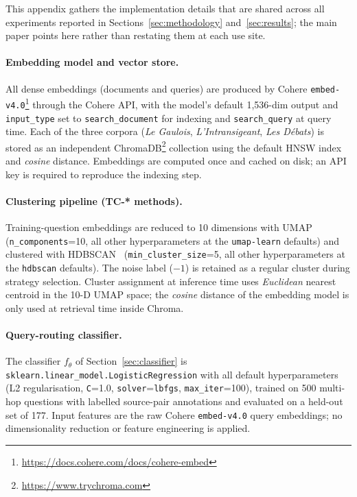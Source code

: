 
This appendix gathers the implementation details that are shared across
all experiments reported in Sections~\ref{sec:methodology}
and~\ref{sec:results}; the main paper points here rather than restating
them at each use site.

\paragraph{Embedding model and vector store.}
All dense embeddings (documents and queries) are produced by Cohere
\texttt{embed-v4.0}\footnote{\url{https://docs.cohere.com/docs/cohere-embed}}
through the Cohere API, with the model's default 1{,}536-dim output and
\texttt{input\_type} set to \texttt{search\_document} for indexing and
\texttt{search\_query} at query time. Each of the three corpora
(\textit{Le Gaulois}, \textit{L'Intransigeant}, \textit{Les D\'ebats}) is
stored as an independent ChromaDB\footnote{\url{https://www.trychroma.com}}
collection using the default HNSW index and \emph{cosine} distance.
Embeddings are computed once and cached on disk; an API key is required to
reproduce the indexing step.

\paragraph{Clustering pipeline (TC-* methods).}
Training-question embeddings are reduced to 10 dimensions with
UMAP~\cite{umap} (\texttt{n\_components}{=}10, all other hyperparameters at
the \texttt{umap-learn} defaults) and clustered with HDBSCAN~\cite{hdbscan}
(\texttt{min\_cluster\_size}{=}5, all other hyperparameters at the
\texttt{hdbscan} defaults). The noise label ($-1$) is retained as a
regular cluster during strategy selection. Cluster assignment at inference
time uses \emph{Euclidean} nearest centroid in the 10-D UMAP space; the
\emph{cosine} distance of the embedding model is only used at retrieval
time inside Chroma.

\paragraph{Query-routing classifier.}
The classifier $f_\theta$ of Section~\ref{sec:classifier} is
\texttt{sklearn.linear\_model.LogisticRegression} with all default
hyperparameters (L2 regularisation, \texttt{C}{=}1.0,
\texttt{solver}{=}\texttt{lbfgs}, \texttt{max\_iter}{=}100), trained on 500
multi-hop questions with labelled source-pair annotations and evaluated on
a held-out set of 177. Input features are the raw Cohere
\texttt{embed-v4.0} query embeddings; no dimensionality reduction or
feature engineering is applied.

